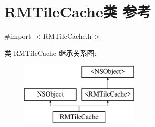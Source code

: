 \hypertarget{interface_r_m_tile_cache}{\section{R\-M\-Tile\-Cache类 参考}
\label{interface_r_m_tile_cache}
}


{\ttfamily \#import $<$R\-M\-Tile\-Cache.\-h$>$}

类 R\-M\-Tile\-Cache 继承关系图\-:\begin{figure}[H]
\begin{center}
\leavevmode
\includegraphics[height=3.000000cm]{interface_r_m_tile_cache}
\end{center}
\end{figure}
